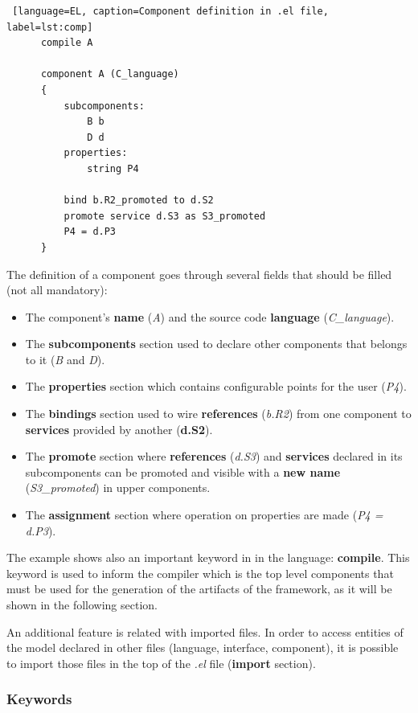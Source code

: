 \documentclass[12pt]{article}
\begin{document}
{\begin{lstlisting} [language=EL, caption=Component definition in .el file, label=lst:comp]
      compile A

      component A (C_language)
      {
          subcomponents:
              B b
              D d
          properties:
              string P4
              
          bind b.R2_promoted to d.S2
          promote service d.S3 as S3_promoted
          P4 = d.P3
      }
\end{lstlisting}

The definition of a component goes through several fields that should be filled (not all mandatory):

\begin{itemize}
\item The component's \textbf{name} (\textit{A}) and the source code \textbf{language} (\textit{C\_language}).
\item The \textbf{subcomponents} section used to declare other components that belongs to it (\textit{B} and \textit{D}).
\item The \textbf{properties} section which contains configurable points for the user (\textit{P4}).
\item The \textbf{bindings} section used to wire \textbf{references} (\textit{b.R2}) from one component to \textbf{services} provided by another (\textbf{d.S2}).
\item The \textbf{promote} section where \textbf{references} (\textit{d.S3}) and \textbf{services} declared in its subcomponents can be promoted and visible with a \textbf{new name} (\textit{S3\_promoted}) in upper components.
\item The \textbf{assignment} section where operation on properties are made (\textit{P4 = d.P3}).
\end{itemize}

The example shows also an important keyword in in the language: \textbf{compile}. This keyword is used to inform the compiler which is the top level components that must be used for the generation of the artifacts of the framework, as it will be shown in the following section.

An additional feature is related with imported files. In order to access entities of the model declared in other files (language, interface, component), it is possible to import those files in the top of the \textit{.el} file (\textbf{import} section).


\subsubsection*{Keywords} 

}
\end{document}

